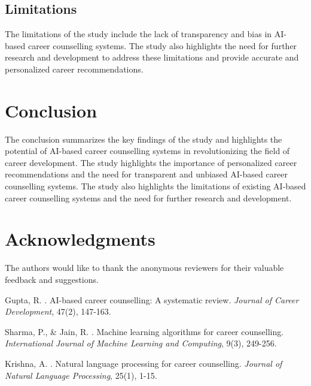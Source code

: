 \documentclass[12pt,a4paper]{article}
\begin{document}
\subsection{Limitations}
The limitations of the study include the lack of transparency and bias in AI-based career counselling systems. The study also highlights the need for further research and development to address these limitations and provide accurate and personalized career recommendations.

\section{Conclusion}
The conclusion summarizes the key findings of the study and highlights the potential of AI-based career counselling systems in revolutionizing the field of career development. The study highlights the importance of personalized career recommendations and the need for transparent and unbiased AI-based career counselling systems. The study also highlights the limitations of existing AI-based career counselling systems and the need for further research and development.

\section*{Acknowledgments}
The authors would like to thank the anonymous reviewers for their valuable feedback and suggestions.


\begin{thebibliography}{99}

Gupta, R. . AI-based career counselling: A systematic review. \emph{Journal of Career Development}, 47(2), 147-163.

Sharma, P., \& Jain, R. . Machine learning algorithms for career counselling. \emph{International Journal of Machine Learning and Computing}, 9(3), 249-256.

Krishna, A. . Natural language processing for career counselling. \emph{Journal of Natural Language Processing}, 25(1), 1-15.

\end{thebibliography}
\end{document}
